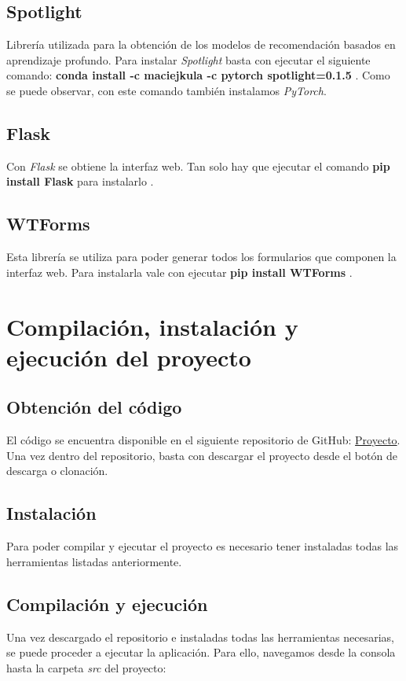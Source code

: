 \subsection{Spotlight}
Librería utilizada para la obtención de los modelos de recomendación basados en aprendizaje profundo. Para instalar \textit{Spotlight} basta con ejecutar el siguiente comando: \textbf{conda install -c maciejkula -c pytorch spotlight=0.1.5} \cite{instalacion-spotlight}. Como se puede observar, con este comando también instalamos \textit{PyTorch}.

\subsection{Flask}
Con \textit{Flask} se obtiene la interfaz web. Tan solo hay que ejecutar el comando \textbf{pip install Flask} para instalarlo \cite{instalacion-flask}.

\subsection{WTForms}
Esta librería se utiliza para poder generar todos los formularios que componen la interfaz web. Para instalarla vale con ejecutar \textbf{pip install WTForms} \cite{instalacion-flask}.

\section{Compilación, instalación y ejecución del proyecto}
\subsection{Obtención del código}
El código se encuentra disponible en el siguiente repositorio de GitHub: \href{https://github.com/rnc0011/SistemaRecomendacionTFG}{Proyecto}. Una vez dentro del repositorio, basta con descargar el proyecto desde el botón de descarga o clonación.


\subsection{Instalación}
Para poder compilar y ejecutar el proyecto es necesario tener instaladas todas las herramientas listadas anteriormente.

\subsection{Compilación y ejecución}
Una vez descargado el repositorio e instaladas todas las herramientas necesarias, se puede proceder a ejecutar la aplicación. Para ello, navegamos desde la consola hasta la carpeta \textit{src} del proyecto:

